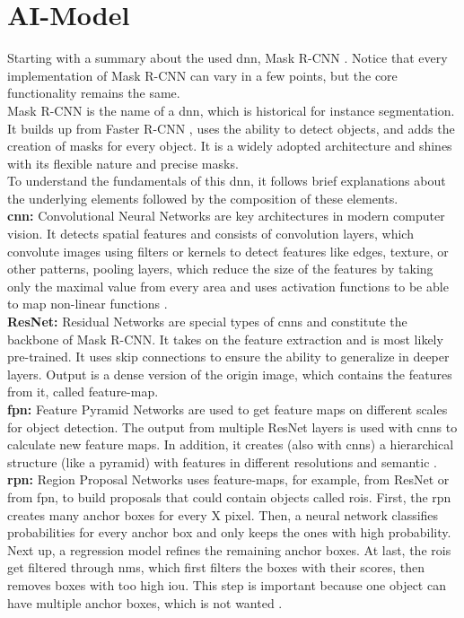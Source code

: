 	\section{AI-Model}
	\label{sec:ai-model}
		Starting with a summary about the used \ac{dnn}, Mask R-CNN \cite{Kaiming2017}. Notice that every implementation of Mask R-CNN can vary in a few points, but the core functionality remains the same.\\
		Mask R-CNN is the name of a \ac{dnn}, which is historical for instance segmentation. It builds up from Faster R-CNN \cite{Ren2016}, uses the ability to detect objects, and adds the creation of masks for every object. It is a widely adopted architecture and shines with its flexible nature and precise masks.\\
		To understand the fundamentals of this \ac{dnn}, it follows brief explanations about the underlying elements followed by the composition of these elements.\\
		\textbf{\ac{cnn}:} Convolutional Neural Networks are key architectures in modern computer vision. It detects spatial features and consists of convolution layers, which convolute images using filters or kernels to detect features like edges, texture, or other patterns, pooling layers, which reduce the size of the features by taking only the maximal value from every area and uses activation functions to be able to map non-linear functions \cite{Oshea2015}.\\
		\textbf{ResNet:} Residual Networks are special types of \ac{cnn}s and constitute the backbone of Mask R-CNN. It takes on the feature extraction and is most likely pre-trained. It uses skip connections to ensure the ability to generalize in deeper layers. Output is a dense version of the origin image, which contains the features from it, called feature-map\cite{He2015}.\\
		\textbf{\ac{fpn}:} Feature Pyramid Networks are used to get feature maps on different scales for object detection. The output from multiple ResNet layers is used with \ac{cnn}s to calculate new feature maps. In addition, it creates (also with \ac{cnn}s) a hierarchical structure (like a pyramid) with features in different resolutions and semantic \cite{Lin2017}.\\
		\textbf{\ac{rpn}:} Region Proposal Networks uses feature-maps, for example, from ResNet or from \ac{fpn}, to build proposals that could contain objects called \ac{roi}s. First, the \ac{rpn} creates many anchor boxes for every X pixel. Then, a neural network classifies probabilities for every anchor box and only keeps the ones with high probability. Next up, a regression model refines the remaining anchor boxes. At last, the \ac{roi}s get filtered through \ac{nms}, which first filters the boxes with their scores, then removes boxes with too high \ac{iou}. This step is important because one object can have multiple anchor boxes, which is not wanted \cite{Ren2016}.\\
